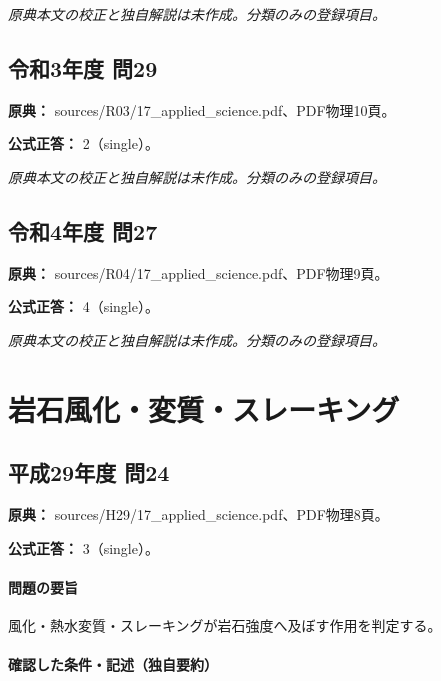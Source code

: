 \par\textit{原典本文の校正と独自解説は未作成。分類のみの登録項目。}

\subsection{令和3年度 問29}
\label{q:r03-reg-applied-29}

\noindent\textbf{原典：} sources/R03/17\_applied\_science.pdf、PDF物理10頁。

\textbf{公式正答：} 2（single）。

\par\textit{原典本文の校正と独自解説は未作成。分類のみの登録項目。}

\subsection{令和4年度 問27}
\label{q:r04-reg-applied-27}

\noindent\textbf{原典：} sources/R04/17\_applied\_science.pdf、PDF物理9頁。

\textbf{公式正答：} 4（single）。

\par\textit{原典本文の校正と独自解説は未作成。分類のみの登録項目。}

\section{岩石風化・変質・スレーキング}

\subsection{平成29年度 問24}
\label{q:h29-reg-applied-24}

\noindent\textbf{原典：} sources/H29/17\_applied\_science.pdf、PDF物理8頁。

\textbf{公式正答：} 3（single）。

\paragraph{問題の要旨} 風化・熱水変質・スレーキングが岩石強度へ及ぼす作用を判定する。

\paragraph{確認した条件・記述（独自要約）}\mbox{}\par


